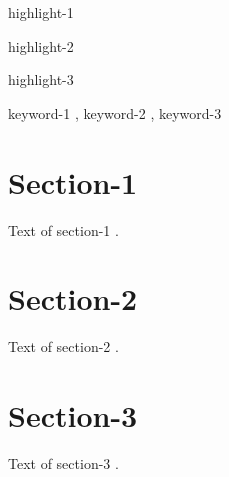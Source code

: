 \documentclass[a4paper,fleqn]{cas-dc}
\begin{document}

\begin{highlights}
\item highlight-1
\item highlight-2
\item highlight-3
\end{highlights}

\begin{keywords}
keyword-1 \sep 
keyword-2 \sep 
keyword-3
\end{keywords}

\maketitle

\section{Section-1}

Text of section-1 \cite{Fortunato2010}.

\section{Section-2}

Text of section-2 \cite{NewmanGirvan2004}.

\section{Section-3}

Text of section-3 \cite{Vehlowetal2013}.

\end{document}
